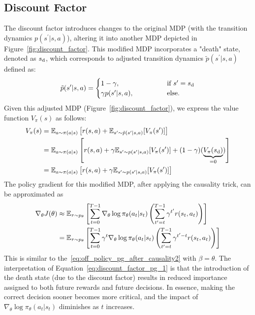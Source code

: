 \documentclass{article}
\begin{document}
\subsection{Discount Factor}
The discount factor introduces changes to the original MDP (with the transition dynamics $p(s^\prime\vert s, a)$), altering it into another MDP depicted in Figure~\ref{fig:discount_factor}. This modified MDP incorporates a "death" state, denoted as $s_{\rm d}$, which corresponds to adjusted transition dynamics $\tilde p(s^\prime\vert s, a)$ defined as:
\begin{align*}
\tilde p(s^\prime \vert s,a) = 
    \begin{cases}
        1 - \gamma, \qquad \qquad &\mbox{if } s^\prime = s_{\rm d}\\
        \gamma p(s^\prime \vert s, a), \qquad\qquad &\mbox{else.} 
    \end{cases}
\end{align*}
Given this adjusted MDP (Figure~\ref{fig:discount_factor}), we express the value function $V_\pi(s)$ as follows:
\begin{align*}
    V_\pi(s) &= {\mathbb E}_{a\sim\pi(a\vert s)}\left[ r(s,a) + {\mathbb E}_{s^\prime \sim \tilde p(s^\prime \vert s, a)}[V_\pi(s^\prime)]\right]\\
    &= {\mathbb E}_{a\sim\pi(a\vert s)}\left[ r(s,a) + \gamma {\mathbb E}_{s^\prime \sim p(s^\prime \vert s, a)}[V_\pi(s^\prime)] + (1 - \gamma)(\underbrace{V_\pi(s_{\rm d})}_{=0}) \right]\\
    &= {\mathbb E}_{a\sim\pi(a\vert s)}\left[ r(s,a) + \gamma{\mathbb E}_{s^\prime \sim p(s^\prime \vert s, a)}[ V_\pi(s^\prime)]\right]
\end{align*}
The policy gradient for this modified MDP, after applying the causality trick, can be approximated as
\begin{align}
\nabla_\theta J(\theta) &\approx {\mathbb E}_{\tau\sim p_\theta}\left[\sum_{t=0}^{T-1} \nabla_\theta \log \pi_\theta(a_t \vert s_t) \left(\sum_{t^\prime = t}^{T-1} \gamma ^{t^\prime}r(s_t, a_t)\right) \right]\nonumber\\
&= {\mathbb E}_{\tau\sim p_\theta}\left[\sum_{t=0}^{T-1} \gamma ^{t }\nabla_\theta \log \pi_\theta(a_t \vert s_t) \left(\sum_{t^\prime = t}^{T-1} \gamma ^{t^\prime -t}r(s_t, a_t)\right) \right]\label{eq:discount_factor_pg_1}
\end{align}
This is similar to the~\eqref{eq:off_policy_pg_after_causality2} with $\beta = \theta$. The interpretation of Equation~\eqref{eq:discount_factor_pg_1} is that the introduction of the death state (due to the discount factor) results in reduced importance assigned to both future rewards and future decisions. In essence, making the correct decision sooner becomes more critical, and the impact of $\nabla_\theta \log \pi_\theta(a_t \vert s_t)$ diminishes as $t$ increases.
\end{document}
